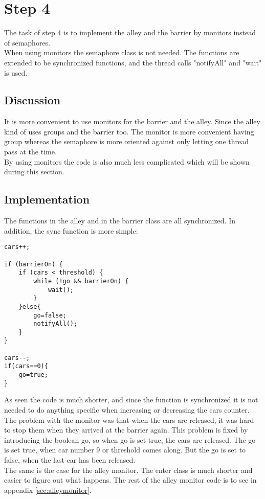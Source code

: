 \section{Step 4}
The task of step 4 is to implement the alley and the barrier by monitors instead of semaphores. \\
When using monitors the semaphore class is not needed. The functions are extended to be synchronized functions, and the thread calls "notifyAll" and "wait" is used.

\subsection{Discussion}
It is more convenient to use monitors for the barrier and the alley. Since the alley kind of uses groups and the barrier too. The monitor is more convenient having group whereas the semaphore is more oriented against only letting one thread pass at the time. \\
By using monitors the code is also much less complicated which will be shown during this section.

\subsection{Implementation}
The functions in the alley and in the barrier class are all synchronized. In addition, the sync function is more simple: 

\begin{lstlisting}
cars++;

if (barrierOn) {
	if (cars < threshold) {
		while (!go && barrierOn) {
			wait();	
		}
	}else{
		go=false;
		notifyAll();
	}
} 

cars--;
if(cars==0){
	go=true;
}
\end{lstlisting}
\vspace{.8cm}

As seen the code is much shorter, and since the function is synchronized it is not needed to do anything specific when increasing or decreasing the cars counter. The problem with the monitor was that when the cars are released, it was hard to stop them when they arrived at the barrier again. This problem is fixed by introducing the boolean go, so when go is set true, the cars are released. The go is set true, when car number 9 or threshold comes along. But the go is set to false, when 
the last car has been released. 
\\

The same is the case for the alley monitor. The enter class is much shorter and easier to figure out what happens. The rest of the alley monitor code is to see in appendix \ref{sec:alleymonitor}. 